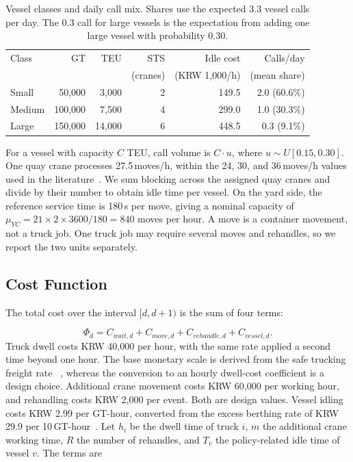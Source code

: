 \begin{table}[tbp]
\centering
\caption{Vessel classes and daily call mix. Shares use the
expected 3.3 vessel calls per day. The 0.3 call for large vessels is the
expectation from adding one large vessel with probability 0.30.}
\label{tab:vessels}
\small
\setlength{\tabcolsep}{4pt}
\begin{tabular}{@{}lrrrrr@{}}
\toprule
Class & GT & TEU & STS & Idle cost & Calls/day \\
 & & & (cranes) & (KRW 1,000/h) & (mean share) \\
\midrule
Small & 50{,}000 & 3{,}000 & 2 & 149.5 & 2.0 (60.6\%) \\
Medium & 100{,}000 & 7{,}500 & 4 & 299.0 & 1.0 (30.3\%) \\
Large & 150{,}000 & 14{,}000 & 6 & 448.5 & 0.3 (9.1\%) \\
\bottomrule
\end{tabular}
\end{table}
For a vessel with capacity $C$ TEU, call volume is $C\cdot u$, where
$u\sim U[0.15,0.30]$. One quay crane processes 27.5\,moves/h, within the
24, 30, and 36\,moves/h values used in the literature~\cite{ref16}. We
sum blocking across the assigned quay cranes and divide by their number
to obtain idle time per vessel.
On the yard side, the reference service time is 180\,s per move, giving
a nominal capacity of $\mu_{YC}=21\times2\times3600/180=840$ moves per
hour. A move is a container movement, not a truck job. One truck job may
require several moves and rehandles, so we report the two units
separately.

\subsection{Cost Function}
\label{sec:env-cost}
The total cost over the interval $[d,d+1)$ is the sum of four terms:

\begin{equation}
\Phi_d=C_{wait,d}+C_{move,d}+C_{rehandle,d}+C_{vessel,d}.
\end{equation}
Truck dwell costs KRW 40{,}000 per hour, with the same rate applied a
second time beyond one hour. The base monetary scale is derived from the safe trucking freight rate
~\cite{ref24}, whereas the conversion to an hourly dwell-cost coefficient
is a design choice. Additional crane movement costs KRW 60{,}000 per working
hour, and rehandling costs KRW 2{,}000 per event. Both are design
values. Vessel idling costs KRW 2.99 per GT-hour, converted from the
excess berthing rate of KRW 29.9 per 10\,GT-hour~\cite{ref25}. Let $h_i$
be the dwell time of truck $i$, $m$ the additional crane working time,
$R$ the number of rehandles, and $T_v$ the policy-related idle time of
vessel $v$. The terms are

